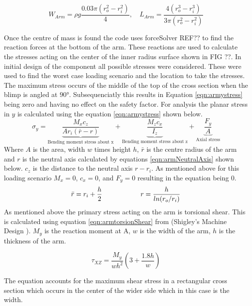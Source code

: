 \documentclass[../main.tex]{subfiles}
\begin{document}
\begin{equation} \label{eqn:armCg}
W_{Arm} = \rho g\frac{0.03\pi(r_o^2 - r_i^2)}{4}, \quad L_{Arm} =\frac{4(r_o^3 - r_i^3)}{3\pi(r_o^2 - r_i^2)}
\end{equation}

Once the centre of mass is found the code uses forceSolver REF?? to find the reaction forces at the bottom of the arm. These reactions are used to calculate the stresses acting on the center of the inner radius surface shown in FIG ??. In initial design of the component all possible stresses were considered. These were used to find the worst case loading scenario and the location to take the stresses. The maximum stress occurs of the middle of the top of the cross section when the blimp is angled at $90°$. Subsequenciatly this results in Equation \ref{eqn:armystress} being zero and having no effect on the safety factor. For analysis the planar stress in $y$ is calculated using the equation \ref{eqn:armystress} shown below. 
\begin{equation}
\label{eqn:armystress}
\sigma_{y}=  \underbrace{\frac{M_{x}c_z}{A r_i (\bar{r} - r)}}_\text{Bending moment stress about x} + \underbrace{\frac{M_{z}c_x}{I_z}}_\text{Bending moment stress about z} + \underbrace{\frac{F_y}{A}}_\text{Axial stress} 
\end{equation}
Where $A$ is the area, width $w$ times height $h$, $\bar{r}$ is the centre radius of the arm and $r$ is the neutral axis calculated by equations \ref{eqn:armNeutralAxis} shown below. $c_z$ is the distance to the neutral axis $r - r_i$. As mentioned above for this loading scenario $M_x = 0$, $c_x = 0$, and $F_y = 0$ resulting in the equation being 0.
\begin{equation} \label{eqn:armNeutralAxis}
\bar{r} = r_i + \frac{h}{2} \hspace{20mm}  r = \frac{h}{ln(r_o/r_i)}
\end{equation}
As mentioned above the primary stress acting on the arm is torsional shear. This is calculated using equation \ref{eqn:armtorsionShear} from {(Shigley's Machine Design \cite[102]{shigley})}. $M_y$ is the reaction moment at A, $w$ is the width of the arm, $h$ is the thickness of the arm.

\begin{equation} \label{eqn:armtorsionShear}
\tau_{XZ} = \dfrac{M_{y}}{wh^2}(3+\frac{1.8h}{w})
\end{equation}

The equation accounts for the maximum shear stress in a rectangular cross section which occurs in the center of the wider side which in this case is the width. \\ 
\end{document}
